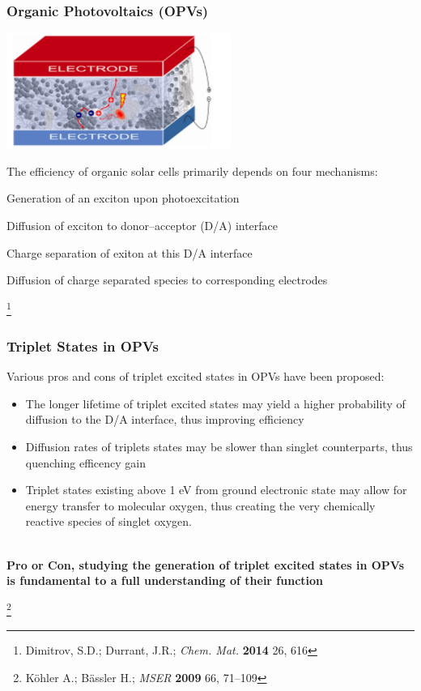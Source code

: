 \documentclass[usepdftitle=false,10pt]{beamer}
\newcommand{\cmark}{\color{green} \ding{51}}%
\newcommand{\xmark}{\color{red} \ding{55}}%
\newcommand{\done}{\rlap{$\square$}{\raisebox{2pt}{\large\hspace{1pt}\cmark}}%
\hspace{-2.5pt}}
\newcommand{\wontfix}{\rlap{$\square$}{\large\hspace{1pt}\xmark}}
\newcommand\blfootnote[1]{%
  \begingroup
  \renewcommand\thefootnote{}\footnote{#1}%
  \addtocounter{footnote}{-1}%
  \endgroup
}
\begin{document}
\begin{frame}
  \frametitle{\textbf{O}rganic \textbf{P}hoto\textbf{v}oltaics (OPVs)}
  \begin{center}
    \includegraphics[width=0.55\textwidth]{OPV}
  \end{center}
  The efficiency of organic solar cells primarily depends on four
  mechanisms:
  \begin{itemize}
    {\color{gray!40}\item[\ding{228}] Generation of an exciton upon photoexcitation}
    \item[\ding{228}] Diffusion of exciton to donor--acceptor (D/A) interface
    {\color{gray!40}\item[\ding{228}] Charge separation of exiton at this D/A interface}
    {\color{gray!40}\item[\ding{228}] Diffusion of charge separated species to corresponding electrodes}
  \end{itemize}
  \blfootnote{\tiny Dimitrov, S.D.; Durrant, J.R.; \emph{Chem. Mat.} \textbf{2014} 26, 616}
\end{frame}
\begin{frame}
  \frametitle{Triplet States in OPVs}

  Various pros and cons of triplet excited states in OPVs have been proposed:
  \begin{itemize}
    \item[\done] The longer lifetime of triplet excited states may yield a higher probability of diffusion
          to the D/A interface, thus improving efficiency
    \item[\wontfix] Diffusion rates of triplets states may be slower than singlet counterparts, thus quenching
          efficency gain
    \item[\wontfix] Triplet states existing above 1 eV from ground electronic state may allow for energy transfer
          to molecular oxygen, thus creating the very chemically reactive species of singlet oxygen.
  \end{itemize}

  \begin{center}
  ~\\
  {\color{gray!10} \Large \bf Pro or Con, studying the generation of triplet excited states in OPVs is fundamental to a full understanding
  of their function}
  \end{center}

  \blfootnote{\tiny K\"{o}hler A.; B\"{a}ssler H.; \emph{MSER} \textbf{2009} 66, 71--109}
\end{frame}
\end{document}

